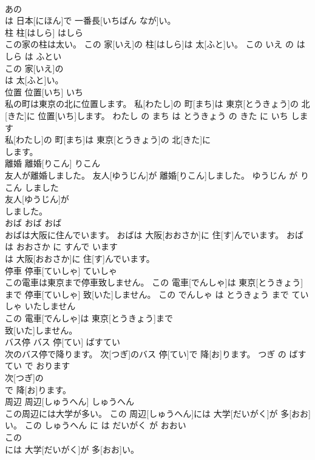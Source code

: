 \documentclass[8pt]{extreport}
\begin{document}
\begin{CJK}{UTF8}{min}
\\	あの
\\	は 日本[にほん]で 一番長[いちばん なが]い。		
\\	柱	柱[はしら]	はしら	
\\	この家の柱は太い。	この 家[いえ]の 柱[はしら]は 太[ふと]い。	この いえ の はしら は ふとい	
\\	この 家[いえ]の
\\	は 太[ふと]い。		
\\	位置	位置[いち]	いち	
\\	私の町は東京の北に位置します。	私[わたし]の 町[まち]は 東京[とうきょう]の 北[きた]に 位置[いち]します。	わたし の まち は とうきょう の きた に いち します	
\\	私[わたし]の 町[まち]は 東京[とうきょう]の 北[きた]に
\\	します。		
\\	離婚	離婚[りこん]	りこん	
\\	友人が離婚しました。	友人[ゆうじん]が 離婚[りこん]しました。	ゆうじん が りこん しました	
\\	友人[ゆうじん]が
\\	しました。		
\\	おば	おば	おば	
\\	おばは大阪に住んでいます。	おばは 大阪[おおさか]に 住[す]んでいます。	おば は おおさか に すんで います	
\\	は 大阪[おおさか]に 住[す]んでいます。		
\\	停車	停車[ていしゃ]	ていしゃ	
\\	この電車は東京まで停車致しません。	この 電車[でんしゃ]は 東京[とうきょう]まで 停車[ていしゃ] 致[いた]しません。	この でんしゃ は とうきょう まで ていしゃ いたしません	
\\	この 電車[でんしゃ]は 東京[とうきょう]まで
\\	致[いた]しません。		
\\	バス停	バス 停[てい]	ばすてい	
\\	次のバス停で降ります。	次[つぎ]のバス 停[てい]で 降[お]ります。	つぎ の ばすてい で おります	
\\	次[つぎ]の
\\	で 降[お]ります。		
\\	周辺	周辺[しゅうへん]	しゅうへん	
\\	この周辺には大学が多い。	この 周辺[しゅうへん]には 大学[だいがく]が 多[おお]い。	この しゅうへん に は だいがく が おおい	
\\	この
\\	には 大学[だいがく]が 多[おお]い。		

\end{CJK}
\end{document}
